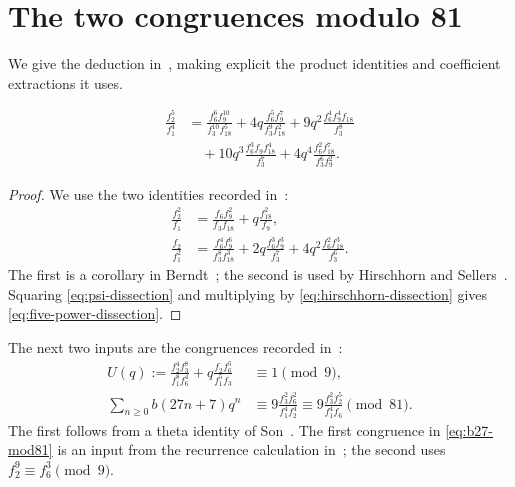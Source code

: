 \section{The two congruences modulo 81}
We give the deduction in~\cite[Section 5]{gireesh}, making explicit the
product identities and coefficient extractions it uses.
\begin{lemma}\label{lem:five-power-dissection}
\begin{equation}\label{eq:five-power-dissection}
\begin{split}
 \frac{f_2^5}{f_1^4}
 &=\frac{f_6^6f_9^{10}}{f_3^{10}f_{18}^5}
   +4q\frac{f_6^5f_9^7}{f_3^9f_{18}^2}
   +9q^2\frac{f_6^4f_9^4f_{18}}{f_3^8}\\
 &\quad+10q^3\frac{f_6^3f_9f_{18}^4}{f_3^7}
   +4q^4\frac{f_6^2f_{18}^7}{f_3^6f_9^2}.
\end{split}
\end{equation}
\end{lemma}
\begin{proof}
We use the two identities recorded in~\cite[Section 5]{gireesh}:
\begin{align}
 \frac{f_2^2}{f_1}
 &=\frac{f_6f_9^2}{f_3f_{18}}+q\frac{f_{18}^2}{f_9},
 \label{eq:psi-dissection}\\
 \frac{f_2}{f_1^2}
 &=\frac{f_6^4f_9^6}{f_3^8f_{18}^3}
   +2q\frac{f_6^3f_9^3}{f_3^7}
   +4q^2\frac{f_6^2f_{18}^3}{f_3^6}.
 \label{eq:hirschhorn-dissection}
\end{align}
The first is a corollary in Berndt~\cite[p.~49]{berndt2}; the second is
used by Hirschhorn and Sellers~\cite{sellers}. Squaring
\eqref{eq:psi-dissection} and multiplying by
\eqref{eq:hirschhorn-dissection} gives \eqref{eq:five-power-dissection}.
\end{proof}

The next two inputs are the congruences recorded in~\cite[Section 5]{gireesh}:
\begin{align}
 U(q):=\frac{f_2^4f_3^8}{f_1^8f_6^4}
       +q\frac{f_2f_6^5}{f_1^5f_3}
 &\equiv1\pmod9,\label{eq:U-congruence}\\
 \sum_{n\ge0}b(27n+7)q^n
 &\equiv9\frac{f_3^2f_6^2}{f_1^4f_2^4}
 \equiv9\frac{f_3^2f_2^5}{f_1^4f_6}\pmod{81}.
 \label{eq:b27-mod81}
\end{align}
The first follows from a theta identity of Son~\cite{hwan}.
The first congruence in \eqref{eq:b27-mod81} is an input from the
recurrence calculation in~\cite{gireesh}; the second uses
$f_2^9\equiv f_6^3\pmod9$.

